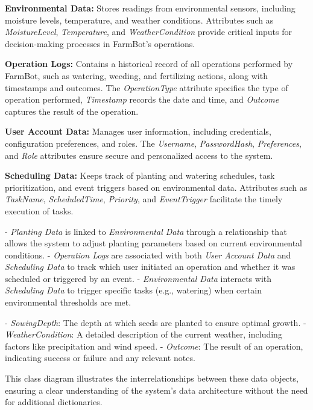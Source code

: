\textbf{Environmental Data:} Stores readings from environmental sensors, including moisture levels, temperature, and weather conditions. Attributes such as \textit{MoistureLevel}, \textit{Temperature}, and \textit{WeatherCondition} provide critical inputs for decision-making processes in FarmBot's operations.

\textbf{Operation Logs:} Contains a historical record of all operations performed by FarmBot, such as watering, weeding, and fertilizing actions, along with timestamps and outcomes. The \textit{OperationType} attribute specifies the type of operation performed, \textit{Timestamp} records the date and time, and \textit{Outcome} captures the result of the operation.

\textbf{User Account Data:} Manages user information, including credentials, configuration preferences, and roles. The \textit{Username}, \textit{PasswordHash}, \textit{Preferences}, and \textit{Role} attributes ensure secure and personalized access to the system.

\textbf{Scheduling Data:} Keeps track of planting and watering schedules, task prioritization, and event triggers based on environmental data. Attributes such as \textit{TaskName}, \textit{ScheduledTime}, \textit{Priority}, and \textit{EventTrigger} facilitate the timely execution of tasks.


- \textit{Planting Data} is linked to \textit{Environmental Data} through a relationship that allows the system to adjust planting parameters based on current environmental conditions.
- \textit{Operation Logs} are associated with both \textit{User Account Data} and \textit{Scheduling Data} to track which user initiated an operation and whether it was scheduled or triggered by an event.
- \textit{Environmental Data} interacts with \textit{Scheduling Data} to trigger specific tasks (e.g., watering) when certain environmental thresholds are met.



- \textit{SowingDepth}: The depth at which seeds are planted to ensure optimal growth.
- \textit{WeatherCondition}: A detailed description of the current weather, including factors like precipitation and wind speed.
- \textit{Outcome}: The result of an operation, indicating success or failure and any relevant notes.

This class diagram illustrates the interrelationships between these data objects, ensuring a clear understanding of the system's data architecture without the need for additional dictionaries.

